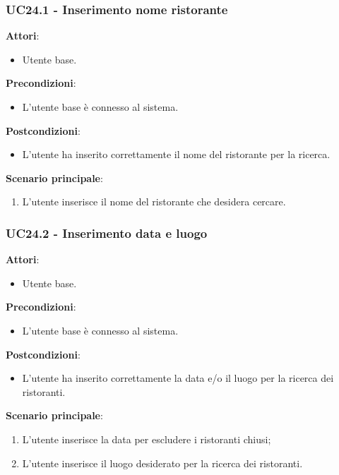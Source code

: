 \subsubsection{UC24.1 - Inserimento nome ristorante
}\label{usecase:24_1}
\textbf{Attori}:
\begin{itemize}
    \item Utente base.
\end{itemize}
\textbf{Precondizioni}:
\begin{itemize}
    \item L'utente base è connesso al sistema.
\end{itemize}
\textbf{Postcondizioni}:
\begin{itemize}
    \item L'utente ha inserito correttamente il nome del ristorante per la ricerca.
\end{itemize}
\textbf{Scenario principale}:
\begin{enumerate}
    \item L'utente inserisce il nome del ristorante che desidera cercare.
\end{enumerate}

\subsubsection{UC24.2 - Inserimento data e luogo
}\label{usecase:24_2}
\textbf{Attori}:
\begin{itemize}
    \item Utente base.
\end{itemize}
\textbf{Precondizioni}:
\begin{itemize}
    \item L'utente base è connesso al sistema.
\end{itemize}
\textbf{Postcondizioni}:
\begin{itemize}
    \item L'utente ha inserito correttamente la data e/o il luogo per la ricerca dei ristoranti.
\end{itemize}
\textbf{Scenario principale}:
\begin{enumerate}
    \item L'utente inserisce la data per escludere i ristoranti chiusi;
    \item L'utente inserisce il luogo desiderato per la ricerca dei ristoranti.
\end{enumerate}


